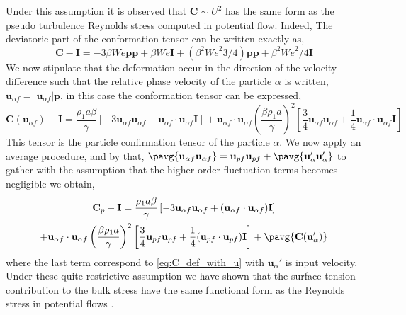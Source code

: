 Under this assumption it is observed that $\textbf{C}\sim U^2$ has the same form as the pseudo turbulence Reynolds stress computed in potential flow. 
Indeed, 
The deviatoric part of the conformation tensor can be written exactly as, 
\begin{equation*}
    \textbf{C} - \textbf{I}  = - 3 \beta \textit{We} \textbf{pp} +  \beta \textit{We} \textbf{I}
    + (\beta^2 \textit{We}^2 3/4) \textbf{pp} + \beta^2 \textit{We}^2/4 \textbf{I} 
\end{equation*}
We now stipulate that the deformation occur in the direction of the velocity difference such that the relative phase velocity of the particle $\alpha$ is written, $\textbf{u}_{\alpha f} = |\textbf{u}_{\alpha f}|\textbf{p}$, in this case the conformation tensor can be expressed, 
\begin{equation}
    \textbf{C}(\textbf{u}_{\alpha f}) - \textbf{I}  =  \frac{ \rho_1 a \beta}{\gamma} \left[
        -  3
        \textbf{u}_{\alpha f}\textbf{u}_{\alpha f}+   \textbf{u}_{\alpha f}\cdot\textbf{u}_{\alpha f}\textbf{I}
    \right]
    +\textbf{u}_{\alpha f}\cdot\textbf{u}_{\alpha f}\left(\frac{ \beta \rho_1 a}{\gamma}\right)^2
    \left[
        \frac{3}{4}
        \textbf{u}_{\alpha f}\textbf{u}_{\alpha f}
        +
        \frac{1}{4}
        \textbf{u}_{\alpha f}\cdot\textbf{u}_{\alpha f}
        \textbf{I}
    \right]
    \label{eq:C_def_with_u}
\end{equation}
This tensor is the particle confirmation tensor of the particle $\alpha$. 
We now apply an average procedure, and by that, $\pavg{\textbf{u}_{\alpha f}\textbf{u}_{\alpha f}} = \textbf{u}_{pf}\textbf{u}_{pf} + \pavg{\textbf{u}_\alpha'\textbf{u}_\alpha'}$ to gather with the assumption that the higher order fluctuation terms becomes negligible we obtain, 
\begin{multline*}
    \textbf{C}_p - \textbf{I}  =  \frac{ \rho_1 a \beta}{\gamma} \left[
        -  3
        \textbf{u}_{\alpha f}\textbf{u}_{\alpha f}
        +   (\textbf{u}_{\alpha f}\cdot\textbf{u}_{\alpha f})\textbf{I}
    \right]\\
    +\textbf{u}_{\alpha f}\cdot\textbf{u}_{\alpha f}\left(\frac{ \beta \rho_1 a}{\gamma}\right)^2
    \left[
        \frac{3}{4}
        \textbf{u}_{p f}\textbf{u}_{p f}
        +
        \frac{1}{4}
        (\textbf{u}_{p f}\cdot\textbf{u}_{p f})
        \textbf{I}
    \right]
    + \pavg{\textbf{C}(\textbf{u}_\alpha')}
\end{multline*}
where the last term correspond to \ref{eq:C_def_with_u} with $\textbf{u}_\alpha'$ is input velocity. 
Under these quite restrictive assumption we have shown that the surface tension contribution to the bulk stress have the same functional form as the Reynolds stress in potential flows \citet{van1982bubble}. 